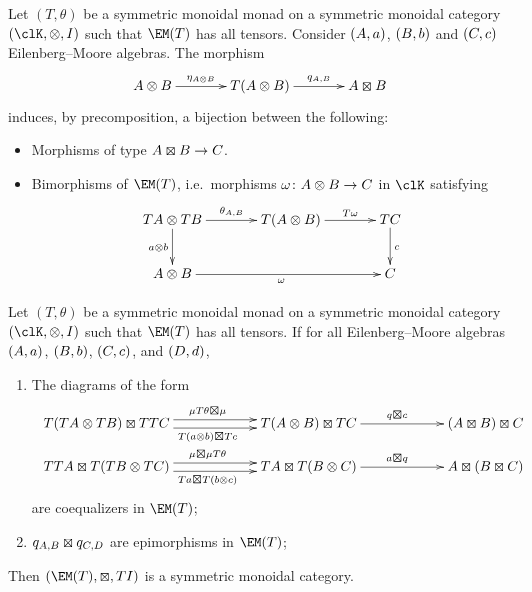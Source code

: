 \begin{proposition}\label{prop:bijection_bimorphisms} Let $(T,\theta)$ be a symmetric monoidal monad on a symmetric monoidal category $(\clK,\otimes,I)$ such that $\EM(T)$ has all tensors.
	Consider $({A},a)$, $({B},b)$ and $({C},c)$ Eilenberg--Moore algebras.
	The morphism
	\[
		\xymatrixcolsep{3pc}\xymatrix{
		\A \otimes \B \ar[r]^(0.45){\eta_{\A\otimes \B}}
		& T(\A\otimes \B) \ar[r]^-{q_{\A,\B}}
		& \A\kocktensor\B
		}
	\]
	induces, by precomposition, a bijection between the following:
	\begin{itemize}
		\item Morphisms of type $\A \kocktensor \B \to \C$.
		\item Bimorphisms of $\EM(T)$, i.e.\ morphisms $\omega\colon {A}\otimes {B}\to {C}$ in $\clK$ satisfying
		      \[
			      \xymatrixcolsep{3pc}\xymatrix{
			      T\A \otimes T\B \ar[r]^{\theta_{\A,\B}} \ar[d]_{a\otimes b}
			      & T(\A\otimes \B) \ar[r]^-{T\omega}
			      & T\C \ar[d]^{c} \\
			      \A\otimes \B \ar[rr]_{\omega}
			      & & \C
			      }
		      \]
	\end{itemize}
\end{proposition}
\begin{theorem}\label{thm:SMC1}
	Let $(T,\theta)$ be a symmetric monoidal monad on a symmetric monoidal category $(\clK,\otimes,I)$ such that $\EM(T)$ has all tensors.
	If for all Eilenberg--Moore algebras $({A},a)$, $({B},b)$, $({C},c)$, and $({D},d)$,
	\begin{enumerate}
		\item \label{it:coeq_associators}
		      The diagrams of the form
		      \begin{equation*}
			      \begin{array}{c}
				      \xymatrix@C=6em{
				      T(T\A\otimes T\B)\kocktensor TT\C
				      \ar@<.7ex>[r]^{\mu T\theta \kocktensor \mu}
				      \ar@<-.7ex>[r]_{T(a\otimes b)\kocktensor Tc}
				       & T(\A\otimes \B)\kocktensor T\C \ar[r]^{q\kocktensor c}  & (\A\kocktensor \B)\kocktensor \C
				      }                                                                                             \\
				      \xymatrix@C=6em{
				      TT\A \kocktensor T(T\B\otimes T\C)
				      \ar@<.7ex>[r]^{\mu  \kocktensor \mu T\theta }
				      \ar@<-.7ex>[r]_{Ta \kocktensor T(b\otimes c)}
				       & T\A \kocktensor T(\B\otimes \C) \ar[r]^{a\kocktensor q} & \A\kocktensor (\B\kocktensor \C)
				      }
			      \end{array}
		      \end{equation*}
		      are coequalizers in $\EM(T)$;
		\item \label{it:coeq_tensor_epic}
		      $q_{\A,\B}\kocktensor q_{\C,\D}$ are epimorphisms in $\EM(T)$;
	\end{enumerate}
	Then $(\EM(T),\kocktensor,TI)$ is a symmetric monoidal category.
\end{theorem}

